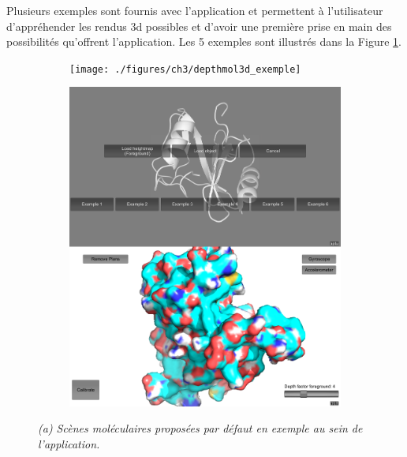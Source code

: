 Plusieurs exemples sont fournis avec l'application et permettent à l'utilisateur d'appréhender les rendus 3d possibles et d'avoir une première prise en main des possibilités qu'offrent l'application. Les 5 exemples sont illustrés dans la Figure \ref{Fig:depthmol3d_exemple}.


\begin{figure}[h]
\begin{subfigure}{.5\textwidth}
  \centering
  {\texttt{[image: ./figures/ch3/depthmol3d\_exemple]}}
    \caption{}
  \label{Fig:depthmol3d_exemple}
\end{subfigure}
\begin{subfigure}{.5\textwidth}
  \centering
  {\includegraphics[width=.75\linewidth]{./figures/ch3/depthmol3d_screenshots}}
    \caption{}
  \label{Fig:depthmol3d_screenshots}
\end{subfigure}
\caption[Exemples de scènes moléculaires crées pour l'application mobile.]{{\it (a) Scènes moléculaires proposées par défaut en exemple au sein de l'application.
}}
\end{figure}
